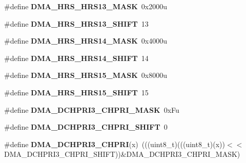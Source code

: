 \begin{DoxyCompactItemize}
\item 
\#define {\bfseries D\+M\+A\+\_\+\+H\+R\+S\+\_\+\+H\+R\+S13\+\_\+\+M\+A\+SK}~0x2000u\hypertarget{group__DMA__Register__Masks_ga918fc7b0985cbe11be58212390f1c816}{}\label{group__DMA__Register__Masks_ga918fc7b0985cbe11be58212390f1c816}

\item 
\#define {\bfseries D\+M\+A\+\_\+\+H\+R\+S\+\_\+\+H\+R\+S13\+\_\+\+S\+H\+I\+FT}~13\hypertarget{group__DMA__Register__Masks_gadffc24f95572e6aab3e33fefe1c1806c}{}\label{group__DMA__Register__Masks_gadffc24f95572e6aab3e33fefe1c1806c}

\item 
\#define {\bfseries D\+M\+A\+\_\+\+H\+R\+S\+\_\+\+H\+R\+S14\+\_\+\+M\+A\+SK}~0x4000u\hypertarget{group__DMA__Register__Masks_ga70ee6df2c5cce431c6b9d3e3f958bd69}{}\label{group__DMA__Register__Masks_ga70ee6df2c5cce431c6b9d3e3f958bd69}

\item 
\#define {\bfseries D\+M\+A\+\_\+\+H\+R\+S\+\_\+\+H\+R\+S14\+\_\+\+S\+H\+I\+FT}~14\hypertarget{group__DMA__Register__Masks_ga183e6503c7ed5e4b07f9df2bf47d46a9}{}\label{group__DMA__Register__Masks_ga183e6503c7ed5e4b07f9df2bf47d46a9}

\item 
\#define {\bfseries D\+M\+A\+\_\+\+H\+R\+S\+\_\+\+H\+R\+S15\+\_\+\+M\+A\+SK}~0x8000u\hypertarget{group__DMA__Register__Masks_ga95ddced80fcb33b665fa1b6aad38210b}{}\label{group__DMA__Register__Masks_ga95ddced80fcb33b665fa1b6aad38210b}

\item 
\#define {\bfseries D\+M\+A\+\_\+\+H\+R\+S\+\_\+\+H\+R\+S15\+\_\+\+S\+H\+I\+FT}~15\hypertarget{group__DMA__Register__Masks_gac91c063a84c76a6cf385cd3bda8f244a}{}\label{group__DMA__Register__Masks_gac91c063a84c76a6cf385cd3bda8f244a}

\item 
\#define {\bfseries D\+M\+A\+\_\+\+D\+C\+H\+P\+R\+I3\+\_\+\+C\+H\+P\+R\+I\+\_\+\+M\+A\+SK}~0x\+Fu\hypertarget{group__DMA__Register__Masks_ga4d1165f5fe24dfa63c7496f07b15e5e2}{}\label{group__DMA__Register__Masks_ga4d1165f5fe24dfa63c7496f07b15e5e2}

\item 
\#define {\bfseries D\+M\+A\+\_\+\+D\+C\+H\+P\+R\+I3\+\_\+\+C\+H\+P\+R\+I\+\_\+\+S\+H\+I\+FT}~0\hypertarget{group__DMA__Register__Masks_gacae7dcb7b9055f80ce91ce52e36d57b6}{}\label{group__DMA__Register__Masks_gacae7dcb7b9055f80ce91ce52e36d57b6}

\item 
\#define {\bfseries D\+M\+A\+\_\+\+D\+C\+H\+P\+R\+I3\+\_\+\+C\+H\+P\+RI}(x)~(((uint8\+\_\+t)(((uint8\+\_\+t)(x))$<$$<$D\+M\+A\+\_\+\+D\+C\+H\+P\+R\+I3\+\_\+\+C\+H\+P\+R\+I\+\_\+\+S\+H\+I\+FT))\&D\+M\+A\+\_\+\+D\+C\+H\+P\+R\+I3\+\_\+\+C\+H\+P\+R\+I\+\_\+\+M\+A\+SK)\hypertarget{group__DMA__Register__Masks_gabac1032f1fad2a3a27d92490812c6eb3}{}\label{group__DMA__Register__Masks_gabac1032f1fad2a3a27d92490812c6eb3}


\end{DoxyCompactItemize}
